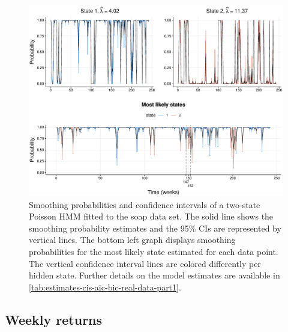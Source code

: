 \documentclass[]{interact}\usepackage[]{graphicx}\usepackage[dvipsnames]{xcolor}
\makeatletter
\def\maxwidth{ %
  \ifdim\Gin@nat@width>\linewidth
    \linewidth
  \else
    \Gin@nat@width
  \fi
}
\newenvironment{knitrout}{}{} %
\theoremstyle{plain}%
\theoremstyle{definition}
\theoremstyle{remark}
\makeatother
\begin{document}
\begin{knitrout}
\color{fgcolor}\begin{figure}[!htb]

{\centering \includegraphics[width=\maxwidth]{figure/smoothing-soap-1} 

}

\caption{Smoothing probabilities and confidence intervals of a two-state Poisson HMM fitted to the soap data set. The solid line shows the smoothing probability estimates and the 95\% CIs are represented by vertical lines. The bottom left graph displays smoothing probabilities for the most likely state estimated for each data point. The vertical confidence interval lines are colored differently per hidden state. Further details on the model estimates are available in \autoref{tab:estimates-cis-aic-bic-real-data-part1}. }\label{fig:smoothing-soap}
\end{figure}

\end{knitrout}

\subsection{Weekly returns}
\label{sec:sm-weekly}
\end{document}
